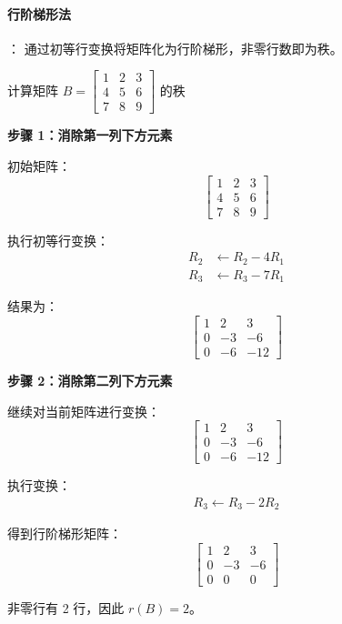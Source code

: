 \paragraph*{行阶梯形法}：	通过初等行变换将矩阵化为行阶梯形，非零行数即为秩。

\vspace{0.8em} %

\begin{example}
	计算矩阵 $ B = \begin{bmatrix} 1 & 2 & 3 \\ 4 & 5 & 6 \\ 7 & 8 & 9 \end{bmatrix} $ 的秩
	
	\vspace{0.5em}
	\begin{flushleft}	
	\textbf{步骤 1：消除第一列下方元素}
	
	初始矩阵：
	\begin{equation}
		\begin{bmatrix} 
			1 & 2 & 3 \\ 
			4 & 5 & 6 \\ 
			7 & 8 & 9 
		\end{bmatrix}
	\end{equation}
	
	执行初等行变换：
	\begin{align*}
		R_2 &\leftarrow R_2 - 4R_1 \\
		R_3 &\leftarrow R_3 - 7R_1
	\end{align*}
	
	结果为：
	\begin{equation}
		\begin{bmatrix} 
			1 & 2 & 3 \\ 
			0 & -3 & -6 \\ 
			0 & -6 & -12 
		\end{bmatrix}
	\end{equation}
	
	\textbf{步骤 2：消除第二列下方元素}
	
	继续对当前矩阵进行变换：
	\begin{equation}
		\begin{bmatrix} 
			1 & 2 & 3 \\ 
			0 & -3 & -6 \\ 
			0 & -6 & -12 
		\end{bmatrix}
	\end{equation}
	
	执行变换：
	\begin{align*}
		R_3 \leftarrow R_3 - 2R_2
	\end{align*}
	
	得到行阶梯形矩阵：
	\begin{equation}
		\begin{bmatrix} 
			1 & 2 & 3 \\ 
			0 & -3 & -6 \\ 
			0 & 0 & 0 
		\end{bmatrix}
	\end{equation}
	
	非零行有 2 行，因此 $ r(B) = 2 $。
	\end{flushleft}

\end{example}


